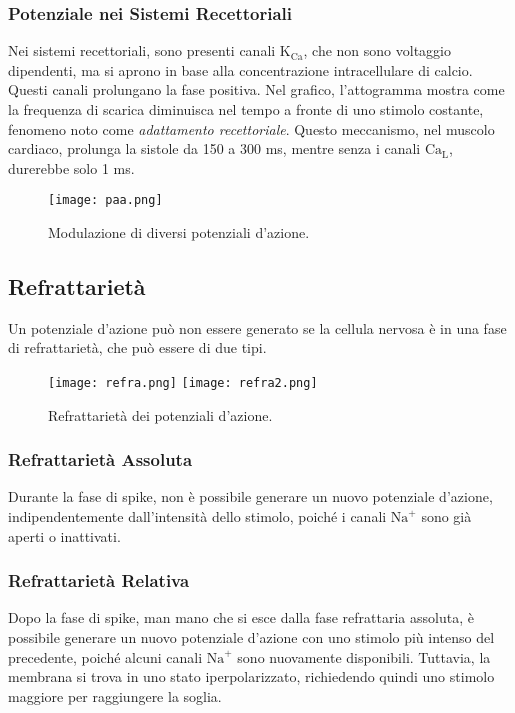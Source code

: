 \subsubsection*{Potenziale nei Sistemi Recettoriali}
Nei sistemi recettoriali, sono presenti canali \( \text{K}_\text{Ca} \), che non sono voltaggio dipendenti, ma si aprono in base alla concentrazione intracellulare di calcio. Questi canali prolungano la fase positiva. Nel grafico, l'attogramma mostra come la frequenza di scarica diminuisca nel tempo a fronte di uno stimolo costante, fenomeno noto come \textit{adattamento recettoriale}. Questo meccanismo, nel muscolo cardiaco, prolunga la sistole da 150 a 300 ms, mentre senza i canali \( \text{Ca}_\text{L} \), durerebbe solo 1 ms.

\begin{figure}[h]
    \centering
    \texttt{[image: paa.png]}
    \caption{Modulazione di diversi potenziali d'azione.}
    \label{fig:paa}
\end{figure}

\subsection{Refrattarietà}
Un potenziale d'azione può non essere generato se la cellula nervosa è in una fase di refrattarietà, che può essere di due tipi.

\begin{figure}[h]
    \centering
    \texttt{[image: refra.png]}
    \texttt{[image: refra2.png]}
    \caption{Refrattarietà dei potenziali d'azione.}
    \label{fig:refra}
\end{figure}

\subsubsection*{Refrattarietà Assoluta}
Durante la fase di spike, non è possibile generare un nuovo potenziale d'azione, indipendentemente dall'intensità dello stimolo, poiché i canali \( \text{Na}^+ \) sono già aperti o inattivati.

\subsubsection*{Refrattarietà Relativa}
Dopo la fase di spike, man mano che si esce dalla fase refrattaria assoluta, è possibile generare un nuovo potenziale d'azione con uno stimolo più intenso del precedente, poiché alcuni canali \( \text{Na}^+ \) sono nuovamente disponibili. Tuttavia, la membrana si trova in uno stato iperpolarizzato, richiedendo quindi uno stimolo maggiore per raggiungere la soglia.

